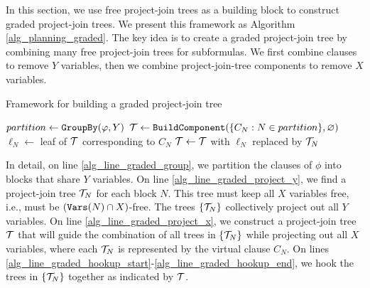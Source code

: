 In this section, we use free project-join trees as a building block to construct graded project-join trees. We present this framework as Algorithm \ref{alg_planning_graded}. The key idea is to create a graded project-join tree by combining many free project-join trees for subformulas. We first combine clauses to remove $Y$ variables, then we combine project-join-tree components to remove $X$ variables.
\begin{algorithm}[t]
\caption{Framework for building a graded project-join tree}
\label{alg_planning_graded}
    \DontPrintSemicolon
    $partition \gets \texttt{\upshape GroupBy}(\varphi, Y)$ \label{alg_line_graded_group} 
    $\mathcal{T} \gets \texttt{\upshape BuildComponent}(\{C_N : N \in partition\}, \varnothing)$ \label{alg_line_graded_project_x} 
     {
        $\ell_N \gets$ leaf of $\T$ corresponding to $C_N$\;
        $\mathcal{T} \gets \mathcal{T}$ with $\ell_N$ replaced by $\mathcal{T}_N$ \label{alg_line_graded_hookup_end}\;
    }
    \Return{$\T$}\;
\end{algorithm}

In detail, on line \ref{alg_line_graded_group}, we partition the clauses of $\phi$ into blocks that share $Y$ variables.
On line \ref{alg_line_graded_project_y}, we find a project-join tree $\mathcal{T}_N$ for each block $N$. This tree must keep all $X$ variables free, i.e., must be $(\texttt{\upshape Vars}(N)\cap X)$-free. The trees $\{\mathcal{T}_N\}$ collectively project out all $Y$ variables. On line \ref{alg_line_graded_project_x}, we construct a project-join tree $\T$ that will guide the combination of all trees in $\{\mathcal{T}_N\}$ while projecting out all $X$ variables, where each $\mathcal{T}_N$ is represented by the virtual clause $C_N$. 
On lines \ref{alg_line_graded_hookup_start}-\ref{alg_line_graded_hookup_end}, we hook the trees in $\{\mathcal{T}_N\}$ together as indicated by $\T$.

